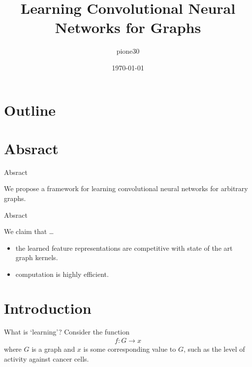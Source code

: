 \documentclass[dvipdfmx]{beamer}
\title{Learning Convolutional Neural Networks for Graphs}
\author{pione30}
\date{\today}
\begin{document}
  \frame[plain]{\titlepage}

\section*{Outline}

  \begin{frame}
    \tableofcontents
  \end{frame}

\section{Absract}

  \begin{frame}{Absract}

    \alert{We propose a framework for learning convolutional neural networks for arbitrary graphs.}
  \end{frame}

  \begin{frame}{Absract}

    \begin{block}{We claim that \dots }
      \begin{itemize}
        \item{the learned feature representations are competitive with state of the art graph kernels.} 
        \item{computation is highly efficient.}
      \end{itemize}
    \end{block}
  \end{frame}

\section{Introduction}

  \begin{frame}{What is `learning'?}
    Consider the function
    \begin{align}
      f: G \to x
    \end{align}
    where $G$ is a graph and $x$ is some corresponding value to $G$, such as the level of activity against cancer cells.

  \end{frame}
\end{document}
